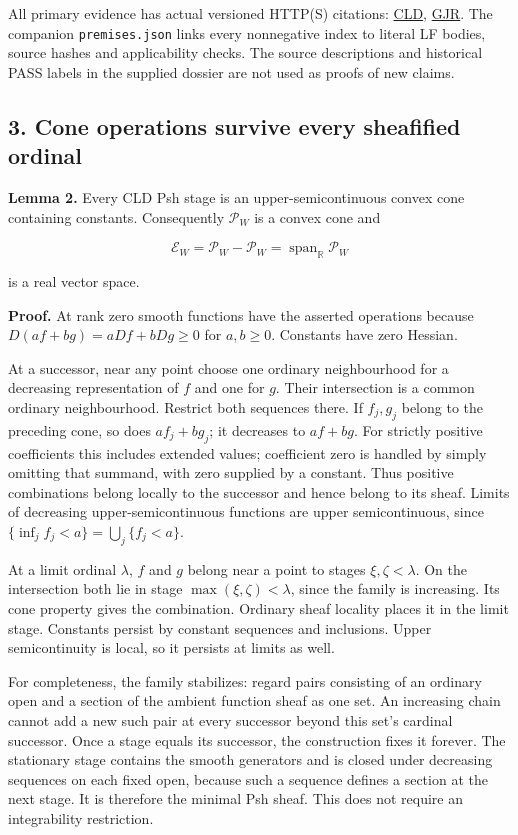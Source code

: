 \documentclass[
  11pt,
]{article}
\begin{document}
All primary evidence has actual versioned HTTP(S) citations:
\href{https://arxiv.org/pdf/1204.6277v2}{CLD},
\href{https://arxiv.org/pdf/2111.05741v3}{GJR}. The companion
\texttt{premises.json} links every nonnegative index to literal LF
bodies, source hashes and applicability checks. The source descriptions
and historical PASS labels in the supplied dossier are not used as
proofs of new claims.

\subsection{3. Cone operations survive every sheafified
ordinal}\label{cone-operations-survive-every-sheafified-ordinal}

\textbf{Lemma 2.} Every CLD Psh stage is an upper-semicontinuous convex
cone containing constants. Consequently \(\mathcal P_W\) is a convex
cone and

\[\mathcal E_W=\mathcal P_W-\mathcal P_W=\operatorname{span}_{\mathbb R}\mathcal P_W\]

is a real vector space.

\textbf{Proof.} At rank zero smooth functions have the asserted
operations because \(D(af+bg)=aDf+bDg\geq0\) for \(a,b\geq0\). Constants
have zero Hessian.

At a successor, near any point choose one ordinary neighbourhood for a
decreasing representation of \(f\) and one for \(g\). Their intersection
is a common ordinary neighbourhood. Restrict both sequences there. If
\(f_j,g_j\) belong to the preceding cone, so does \(af_j+bg_j\); it
decreases to \(af+bg\). For strictly positive coefficients this includes
extended values; coefficient zero is handled by simply omitting that
summand, with zero supplied by a constant. Thus positive combinations
belong locally to the successor and hence belong to its sheaf. Limits of
decreasing upper-semicontinuous functions are upper semicontinuous,
since \(\{\inf_j f_j<a\}=\bigcup_j\{f_j<a\}\).

At a limit ordinal \(\lambda\), \(f\) and \(g\) belong near a point to
stages \(\xi,\zeta<\lambda\). On the intersection both lie in stage
\(\max(\xi,\zeta)<\lambda\), since the family is increasing. Its cone
property gives the combination. Ordinary sheaf locality places it in the
limit stage. Constants persist by constant sequences and inclusions.
Upper semicontinuity is local, so it persists at limits as well.

For completeness, the family stabilizes: regard pairs consisting of an
ordinary open and a section of the ambient function sheaf as one set. An
increasing chain cannot add a new such pair at every successor beyond
this set's cardinal successor. Once a stage equals its successor, the
construction fixes it forever. The stationary stage contains the smooth
generators and is closed under decreasing sequences on each fixed open,
because such a sequence defines a section at the next stage. It is
therefore the minimal Psh sheaf. This does not require an integrability
restriction.
\end{document}
